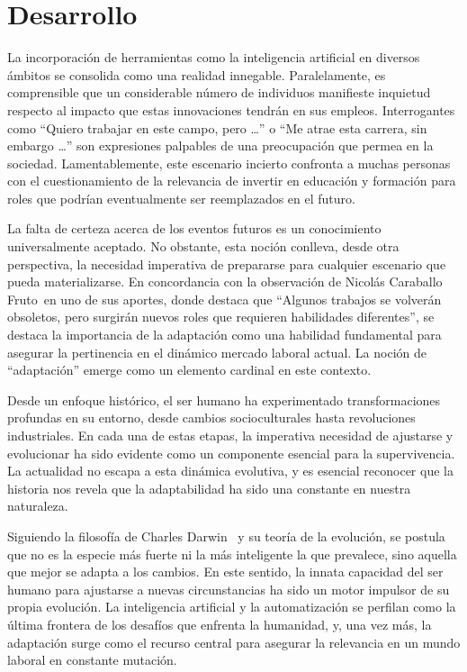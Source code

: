 \documentclass[letterpaper, 12pt]{article}
\newcommand{\memberNicolas}{Nicolás Caraballo Fruto~}
\begin{document}
\section*{Desarrollo}

La incorporación de herramientas como la inteligencia
artificial en diversos ámbitos se consolida como una
realidad innegable. Paralelamente, es comprensible que un
considerable número de individuos manifieste inquietud
respecto al impacto que estas innovaciones tendrán en sus
empleos. Interrogantes como ``Quiero trabajar en este
campo, pero \dots'' o ``Me atrae esta carrera, sin embargo
\dots'' son expresiones palpables de una preocupación que
permea en la sociedad. Lamentablemente, este escenario
incierto confronta a muchas personas con el cuestionamiento
de la relevancia de invertir en educación y formación para
roles que podrían eventualmente ser reemplazados en el
futuro.

La falta de certeza acerca de los eventos futuros es un
conocimiento universalmente aceptado. No obstante, esta
noción conlleva, desde otra perspectiva, la necesidad
imperativa de prepararse para cualquier escenario que pueda
materializarse. En concordancia con la observación de
\memberNicolas en uno de sus aportes, donde destaca que
``Algunos trabajos se volverán obsoletos, pero surgirán
nuevos roles que requieren habilidades diferentes'', se
destaca la importancia de la adaptación como una habilidad
fundamental para asegurar la pertinencia en el dinámico
mercado laboral actual. La noción de ``adaptación'' emerge
como un elemento cardinal en este contexto.

Desde un enfoque histórico, el ser humano ha experimentado
transformaciones profundas en su entorno, desde cambios
socioculturales hasta revoluciones industriales. En cada
una de estas etapas, la imperativa necesidad de ajustarse y
evolucionar ha sido evidente como un componente esencial
para la supervivencia. La actualidad no escapa a esta
dinámica evolutiva, y es esencial reconocer que la historia
nos revela que la adaptabilidad ha sido una constante en
nuestra naturaleza.

Siguiendo la filosofía de Charles Darwin~\cite{Darwin} y su
teoría de la evolución, se postula que no es la especie más
fuerte ni la más inteligente la que prevalece, sino aquella
que mejor se adapta a los cambios. En este sentido, la
innata capacidad del ser humano para ajustarse a nuevas
circunstancias ha sido un motor impulsor de su propia
evolución. La inteligencia artificial y la automatización
se perfilan como la última frontera de los desafíos que
enfrenta la humanidad, y, una vez más, la adaptación surge
como el recurso central para asegurar la relevancia en un
mundo laboral en constante mutación.
\end{document}
